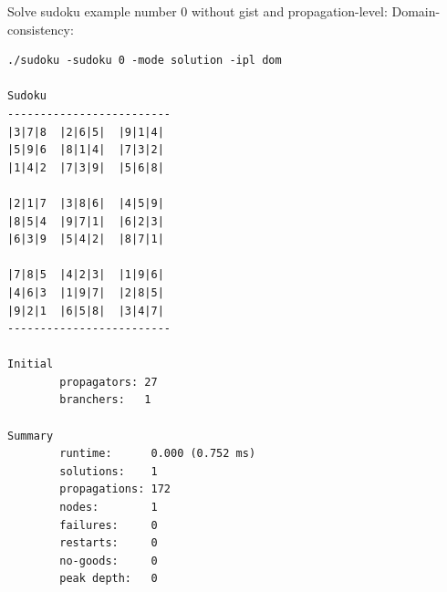 \documentclass[a4paper, 11pt]{article}
\begin{document}
Solve sudoku example number $0$ without gist and propagation-level: Domain-consistency:
\begin{verbatim}
./sudoku -sudoku 0 -mode solution -ipl dom

Sudoku
-------------------------
|3|7|8  |2|6|5|  |9|1|4|
|5|9|6  |8|1|4|  |7|3|2|
|1|4|2  |7|3|9|  |5|6|8|

|2|1|7  |3|8|6|  |4|5|9|
|8|5|4  |9|7|1|  |6|2|3|
|6|3|9  |5|4|2|  |8|7|1|

|7|8|5  |4|2|3|  |1|9|6|
|4|6|3  |1|9|7|  |2|8|5|
|9|2|1  |6|5|8|  |3|4|7|
-------------------------

Initial
        propagators: 27
        branchers:   1

Summary
        runtime:      0.000 (0.752 ms)
        solutions:    1
        propagations: 172
        nodes:        1
        failures:     0
        restarts:     0
        no-goods:     0
        peak depth:   0

\end{verbatim}
{}

\end{document}
